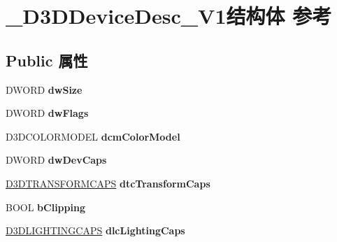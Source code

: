 \hypertarget{struct___d3_d_device_desc___v1}{}\section{\+\_\+\+D3\+D\+Device\+Desc\+\_\+\+V1结构体 参考}
\label{struct___d3_d_device_desc___v1}
\subsection*{Public 属性}
\begin{DoxyCompactItemize}
\item 
\mbox{\label{struct___d3_d_device_desc___v1_af757f4187d1f0312fff3e9ddebe83feb}} 
D\+W\+O\+RD {\bfseries dw\+Size}
\item 
\mbox{\label{struct___d3_d_device_desc___v1_ad42f569e217c3d6c381dc98701cb0723}} 
D\+W\+O\+RD {\bfseries dw\+Flags}
\item 
\mbox{\label{struct___d3_d_device_desc___v1_a2bdfd61358f76781a06f858ae3aa084d}} 
D3\+D\+C\+O\+L\+O\+R\+M\+O\+D\+EL {\bfseries dcm\+Color\+Model}
\item 
\mbox{\label{struct___d3_d_device_desc___v1_a52993572a4e9de218dc33140b0b9e59a}} 
D\+W\+O\+RD {\bfseries dw\+Dev\+Caps}
\item 
\mbox{\label{struct___d3_d_device_desc___v1_afcb01e1d9107620a76df02ad48ff4772}} 
\hyperlink{struct___d3_d_t_r_a_n_s_f_o_r_m_c_a_p_s}{D3\+D\+T\+R\+A\+N\+S\+F\+O\+R\+M\+C\+A\+PS} {\bfseries dtc\+Transform\+Caps}
\item 
\mbox{\label{struct___d3_d_device_desc___v1_a753585f7c20dbae9b420de46ebd0d217}} 
B\+O\+OL {\bfseries b\+Clipping}
\item 
\mbox{\label{struct___d3_d_device_desc___v1_ab5474b7390933d83e630e6653aad711d}} 
\hyperlink{struct___d3_d_l_i_g_h_t_i_n_g_c_a_p_s}{D3\+D\+L\+I\+G\+H\+T\+I\+N\+G\+C\+A\+PS} {\bfseries dlc\+Lighting\+Caps}
\item 
\mbox{\label{struct___d3_d_device_desc___v1_a4b09f063985d28ccb33646d8ac149073}} 

\end{DoxyCompactItemize}
